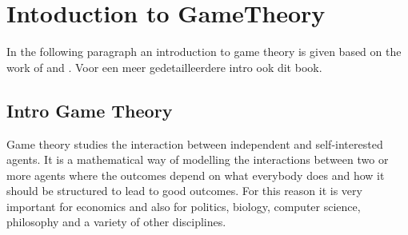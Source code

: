 \chapter{Intoduction to GameTheory}
\label{cha:1}
%


In the following paragraph an introduction to game theory is given based on the work of  and . Voor een meer gedetailleerdere intro ook dit book.
\section{Intro Game Theory}
\label{Cha:1:Intro.Game.Theory}


Game theory studies the interaction between independent and self-interested agents. It is a mathematical way of modelling the interactions between two or more agents where the outcomes depend on what everybody does and how it should be structured to lead to good outcomes. For this reason it is very important for economics and also for politics, biology, computer science, philosophy and a variety of other disciplines.  \\

